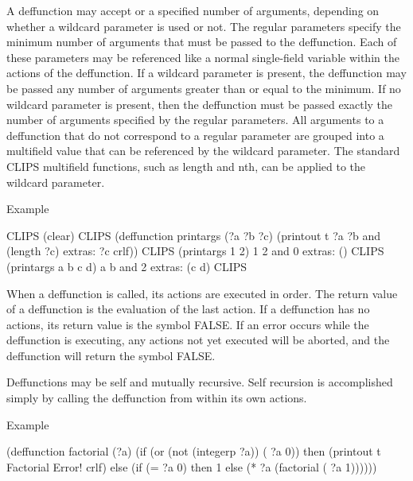 \documentclass[letterpaper,10pt,english]{sphinxmanual}
\begin{document}
A deffunction may accept  or  a specified number of
arguments, depending on whether a wildcard parameter is used or not. The
regular parameters specify the minimum number of arguments that must be
passed to the deffunction. Each of these parameters may be referenced
like a normal single-field variable within the actions of the
deffunction. If a wildcard parameter is present, the deffunction may be
passed any number of arguments greater than or equal to the minimum. If
no wildcard parameter is present, then the deffunction must be passed
exactly the number of arguments specified by the regular parameters. All
arguments to a deffunction that do not correspond to a regular parameter
are grouped into a multifield value that can be referenced by the
wildcard parameter. The standard CLIPS multifield functions, such as
length and nth, can be applied to the wildcard parameter.

Example

\begin{sphinxVerbatim}[commandchars=\\\{\}]
CLIPS\PYGZgt{} (clear)
CLIPS\PYGZgt{}
(deffunction print\PYGZhy{}args (?a ?b \PYGZdl{}?c)
  (printout t ?a \PYGZdq{} \PYGZdq{} ?b \PYGZdq{} and \PYGZdq{} (length ?c) \PYGZdq{} extras: \PYGZdq{} ?c crlf))
CLIPS\PYGZgt{} (print\PYGZhy{}args 1 2)
1 2 and 0 extras: ()
CLIPS\PYGZgt{} (print\PYGZhy{}args a b c d)
a b and 2 extras: (c d)
CLIPS\PYGZgt{}
\end{sphinxVerbatim}

When a deffunction is called, its actions are executed in order. The
return value of a deffunction is the evaluation of the last action. If a
deffunction has no actions, its return value is the symbol FALSE. If an
error occurs while the deffunction is executing, any actions not yet
executed will be aborted, and the deffunction will return the symbol
FALSE.

Deffunctions may be self and mutually recursive. Self recursion is
accomplished simply by calling the deffunction from within its own
actions.

Example

\begin{sphinxVerbatim}[commandchars=\\\{\}]
(deffunction factorial (?a)
  (if (or (not (integerp ?a)) (\PYGZlt{} ?a 0)) then
    (printout t \PYGZdq{}Factorial Error!\PYGZdq{} crlf)
   else
    (if (= ?a 0) then
       1
     else
       (* ?a (factorial (\PYGZhy{} ?a 1))))))
\end{sphinxVerbatim}
\end{document}
